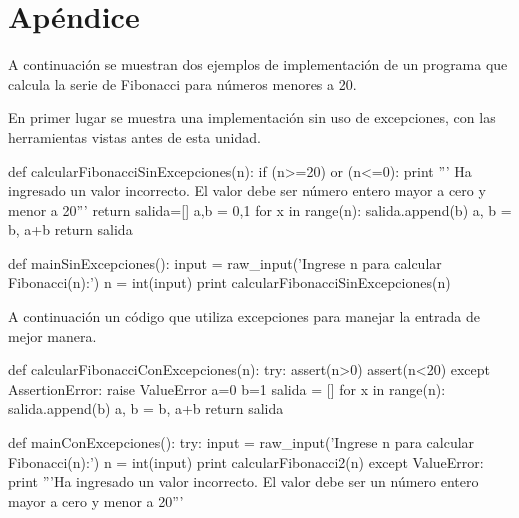 \section{Apéndice}
A continuación se muestran dos ejemplos de implementación de un programa que
calcula la serie de Fibonacci para números menores a 20. 

En primer lugar se muestra una implementación sin uso de excepciones, con
las herramientas vistas antes de esta unidad.

\begin{codigo-python}
def calcularFibonacciSinExcepciones(n):
	if (n>=20) or (n<=0):
		print ''' Ha ingresado un valor incorrecto.
El valor debe ser número entero mayor a cero y menor a 20'''
		return
	salida=[]
	a,b = 0,1
	for x in range(n):
		salida.append(b)
		a, b = b, a+b
	return salida

def mainSinExcepciones():
	input = raw_input('Ingrese n para calcular Fibonacci(n):')
	n = int(input)
	print calcularFibonacciSinExcepciones(n)
\end{codigo-python}

A continuación un código que utiliza excepciones para manejar la entrada de
mejor manera.

\begin{codigo-python}
def calcularFibonacciConExcepciones(n):
	try:
		assert(n>0)
		assert(n<20)
	except AssertionError:
		raise ValueError
	a=0
	b=1           
	salida = []
	for x in range(n):
		salida.append(b)
		a, b = b, a+b
	return salida

def mainConExcepciones():
	try:
		input = raw_input('Ingrese n para calcular Fibonacci(n):')
		n = int(input)
		print calcularFibonacci2(n)
	except ValueError:
		print '''Ha ingresado un valor incorrecto.
El valor debe ser un número entero mayor a cero y menor a 20'''
\end{codigo-python}
